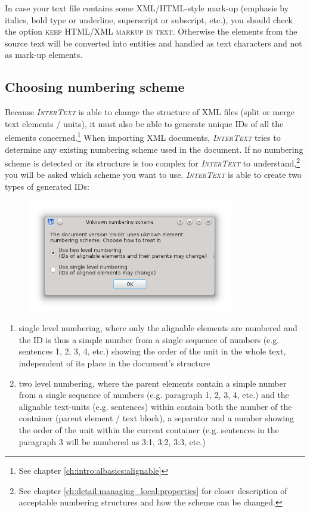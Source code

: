 \documentclass[a4paper,10pt,oneside]{book}
\newcommand{\IT}{\textit{\textsc{InterText}}\xspace}
\newcommand{\menu}[1]{\textsc{#1}}
\begin{document}
In case your text file contains some XML/HTML-style mark-up (emphasis by italics, bold type or underline, superscript or subscript, etc.), you should check the option \menu{keep HTML/XML markup in text}. Otherwise the elements from the source text will be converted into entities and handled as text characters and not as mark-up elements.

\subsection{Choosing numbering scheme}\label{ch:detail:managing_local:new:numbering}

Because \IT is able to change the structure of XML files (split or merge text elements / units), it must also be able to generate unique IDs of all the elements concerned.\footnote{See chapter \ref{ch:intro:albasics:alignable}} When importing XML documents, \IT tries to determine any existing numbering scheme used in the document. If no numbering scheme is detected or its structure is too complex for \IT to understand,\footnote{See chapter \ref{ch:detail:managing_local:properties} for closer description of acceptable numbering structures and how the scheme can be changed.} you will be asked which scheme you want to use. \IT is able to create two types of generated IDs:

\begin{figure}[htbf]
 \includegraphics[width=0.8\textwidth]{screenshots/numbering_dialog.png}
\end{figure}

\begin{enumerate}
 \item single level numbering, where only the alignable elements are numbered and the ID is thus a simple number from a single sequence of numbers (e.g. sentences 1, 2, 3, 4, etc.) showing the order of the unit in the whole text, independent of its place in the document's structure
 \item two level numbering, where the parent elements contain a simple number from a single sequence of numbers (e.g. paragraph 1, 2, 3, 4, etc.) and the alignable text-units (e.g. sentences) within contain both the number of the container (parent element / text block), a separator and a number showing the order of the unit within the current container (e.g. sentences in the paragraph 3 will be numbered as 3:1, 3:2, 3:3, etc.)
\end{enumerate}
\end{document}
